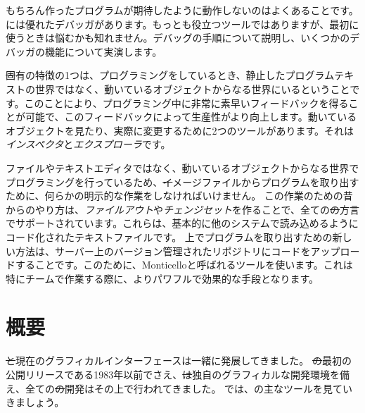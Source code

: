 \documentclass[a4paper,10pt,twoside]{book}
\begin{document}
もちろん作ったプログラムが期待したように動作しないのはよくあることです。\pharo には優れたデバッガがあります。もっとも役立つツールではありますが、最初に使うときは悩むかも知れません。デバッグの手順について説明し、いくつかのデバッガの機能について実演します。

\st 固有の特徴の1つは、プログラミングをしているとき、静止したプログラムテキストの世界ではなく、動いているオブジェクトからなる世界にいるということです。このことにより、プログラミング中に非常に素早いフィードバックを得ることが可能で、このフィードバックによって生産性がより向上します。動いているオブジェクトを見たり、実際に変更するために2つのツールがあります。それは\emph{インスペクタ}と\emph{エクスプローラ}です。

ファイルやテキストエディタではなく、動いているオブジェクトからなる世界でプログラミングを行っているため、\st イメージファイルからプログラムを取り出すために、何らかの明示的な作業をしなければいけません。
この作業のための昔からのやり方は、\emph{ファイルアウト}や\emph{チェンジセット}を作ることで、全ての\st の方言でサポートされています。これらは、基本的に他のシステムで読み込めるようにコード化されたテキストファイルです。
\pharo 上でプログラムを取り出すための新しい方法は、サーバー上のバージョン管理されたリポジトリにコードをアップロードすることです。このために、Monticelloと呼ばれるツールを使います。これは特にチームで作業する際に、よりパワフルで効果的な手段となります。


\section{概要}

\st と現在のグラフィカルインターフェースは一緒に発展してきました。
\st の最初の公開リリースである1983年以前でさえ、\st は独自のグラフィカルな開発環境を備え、全ての\st の開発はその上で行われてきました。
では、\pharo の主なツールを見ていきましょう。
\end{document}
